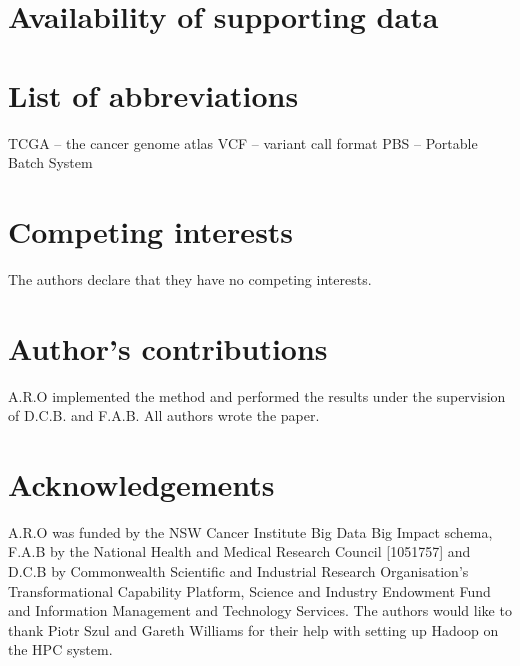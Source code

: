 \documentclass[twocolumn]{bmcart}%
\begin{document}
\begin{backmatter}

\section*{Availability of supporting data}
\section*{List of abbreviations}
TCGA -- the cancer genome atlas
VCF -- variant call format
PBS -- Portable Batch System

\section*{Competing interests}
  The authors declare that they have no competing interests.

\section*{Author's contributions}
A.R.O implemented the method and performed the results under the supervision of D.C.B. and F.A.B.
All authors wrote the paper.  


\section*{Acknowledgements}
A.R.O was funded by the NSW Cancer Institute Big Data Big Impact schema, F.A.B by the National Health and Medical Research Council [1051757] and D.C.B by Commonwealth Scientific and Industrial Research Organisation's Transformational Capability Platform, Science and Industry Endowment Fund and Information Management and Technology Services.
The authors would like to thank Piotr Szul and Gareth Williams for their help with setting up Hadoop on the HPC system.  




\end{backmatter}
\end{document}
